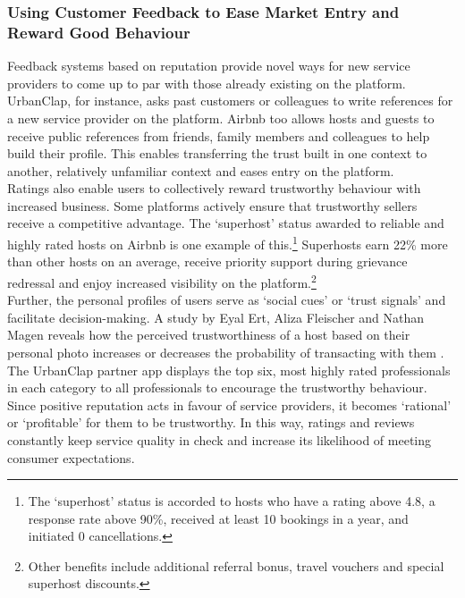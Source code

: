 \documentclass[a4paper, 12pt, twoside]{article}
\begin{document}
	\subsubsection{Using Customer Feedback to Ease Market Entry and Reward Good Behaviour}
                    
 Feedback systems based on reputation provide novel ways for new service providers to come up to par with those already existing on the platform. UrbanClap, for instance, asks past customers or colleagues to write references for a new service provider on the platform. Airbnb too allows hosts and guests to receive public references from friends, family members and colleagues to help build their profile. This enables transferring the trust built in one context to another, relatively unfamiliar context and eases entry on the platform.\\
                    
                 Ratings also enable users to collectively reward trustworthy behaviour with increased business. Some platforms actively ensure that trustworthy sellers receive a competitive advantage. The ‘superhost’ status awarded to reliable and highly rated hosts on Airbnb is one example of this.\footnote{The ‘superhost’ status is accorded to hosts who have a rating above 4.8, a response rate above 90\%, received at least 10 bookings in a year, and initiated 0 cancellations.} Superhosts earn 22\% more than other hosts on an average, receive priority support during grievance redressal and enjoy increased visibility on the platform.\footnote{Other benefits include additional referral bonus, travel vouchers and special superhost discounts.}   \\

Further, the personal profiles of users serve as ‘social cues’ or ‘trust signals’ and facilitate decision-making. A study by Eyal Ert, Aliza Fleischer and Nathan Magen reveals how the perceived trustworthiness of a host based on their personal photo increases or decreases the probability of transacting with them \parencite{ert2016trust}.\\

The UrbanClap partner app displays the top six, most highly rated professionals in each category to all professionals to encourage the trustworthy behaviour. \\

Since positive reputation acts in favour of service providers, it becomes ‘rational’ or ‘profitable’ for them to be trustworthy. In this way, ratings and reviews constantly keep service quality in check and increase its likelihood of meeting consumer expectations.\\
\end{document}

